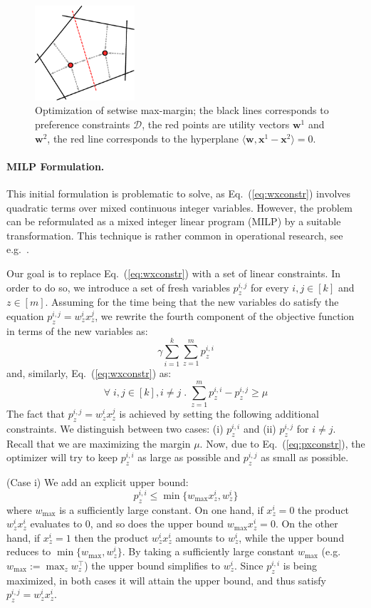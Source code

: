 \documentclass{article}
\renewcommand\[{\begin{equation}}
\renewcommand\]{\end{equation}}
\newcommand{\calvar}[1]{\ensuremath{\mathcal{#1}}}
\newcommand{\calD}{\calvar{D}}
\newcommand{\vecvar}[1]{\ensuremath{\boldsymbol{#1}}}
\newcommand{\vw}{\vecvar{w}}
\newcommand{\vx}{\vecvar{x}}
\begin{document}
\begin{figure}[t]
    \begin{center}
        \includegraphics[width=10em]{figures/setmargin}
    \end{center}
    \caption{\label{fig:setmargin} Optimization of setwise max-margin; the black lines corresponds to preference constraints $\calD$, the red points are utility vectors $\vw^{1}$ and $\vw^{2}$, the red line corresponds to the hyperplane $\langle \vw, \vx^{1} - \vx^{2} \rangle = 0$.}
\end{figure}

\paragraph{MILP Formulation.} This initial formulation is problematic
to solve, as Eq.~(\ref{eq:wxconstr}) involves quadratic terms over mixed
continuous integer variables. However, the problem can be reformulated as a
mixed integer linear program (MILP) by a suitable transformation. This
technique is rather common in operational research, see
e.g.~\cite{boutilier2006}.

Our goal is to replace Eq.~(\ref{eq:wxconstr}) with a set of linear
constraints. In order to do so, we introduce a set of fresh variables
$p^{i,j}_z$ for every $i,j\in[k]$ and $z\in[m]$. Assuming for the time
being that the new variables do satisfy the equation
$p^{i,j}_z = w^i_z x^j_z$, we rewrite the fourth component of the
objective function in terms of the new variables as:
%
$$ \gamma \sum_{i=1}^k \sum_{z=1}^m p^{i,i}_z$$
%
and, similarly, Eq.~(\ref{eq:wxconstr}) as:
%
\[ \forall \; i, j \in [k], i \neq j \;.\; \sum_{z=1}^m p^{i,i}_z - p^{i,j}_z \ge \mu \label{eq:pxconstr} \]
%
The fact that $p^{i,j}_z = w^{i}_z x^{j}_z$ is achieved by
setting the following additional constraints. We distinguish between two cases:
(i) $p^{i,i}_z$ and (ii) $p^{i,j}_z$ for $i \ne j$.  Recall that we are
maximizing the margin $\mu$. Now, due to Eq.~(\ref{eq:pxconstr}), the optimizer will
try to keep $p^{i,i}_z$ as large as possible and $p^{i,j}_z$ as small as
possible.

(Case i) We add an explicit upper bound:
%
$$ p^{i,i}_z \le \min \{ w_\text{max} x^{i}_z, w^{i}_z \} $$
%
where $w_\text{max}$ is a sufficiently large constant.
On one hand, if $x^i_z = 0$ the product $w^i_z x^i_z$ evaluates to $0$, and so does
the upper bound $w_\text{max} x^{i}_z = 0$. On the other hand, if $x^i_z=1$
then the product $w^i_z x^i_z$ amounts to $w^i_z$, while the upper
bound reduces to $\min \{ w_\text{max}, w^{i}_z \}$. By taking a sufficiently
large constant $w_\text{max}$ (e.g. $w_\text{max} := \max_z w^\top_z$) the
upper bound simplifies to $w^i_z$. Since $p^{i,i}_z$ is being maximized, in
both cases it will attain the upper bound, and thus satisfy $p^{i,j}_z = w^i_z x^i_z$.
\end{document}
